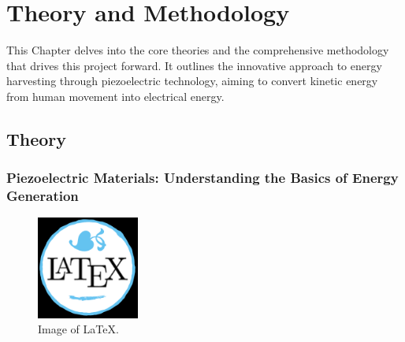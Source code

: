 \documentclass[11pt]{report}	%
\begin{document}
\newpage
\chapter{Theory and Methodology} %


This Chapter delves into the core theories and the comprehensive methodology that drives this project forward. It outlines the innovative approach to energy harvesting through piezoelectric technology, aiming to convert kinetic energy from human movement into electrical energy.

\section{Theory }

\subsection{Piezoelectric Materials: Understanding the Basics of Energy Generation}

\begin{figure}[h] %

\centering  %

\includegraphics[width=0.3\textwidth]{Latex} %

\caption{Image of \LaTeX.} %

\label{Fig1}

\end{figure}
\end{document}
